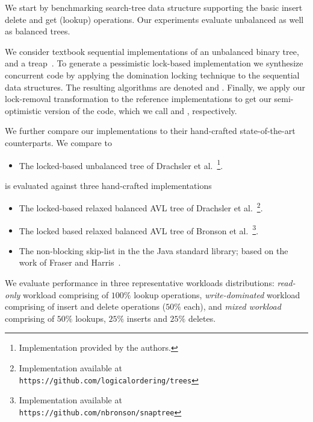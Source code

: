 We start by benchmarking search-tree data structure supporting the basic insert
delete and get (lookup) operations. Our experiments evaluate unbalanced as well
as balanced trees.  

We consider textbook sequential implementations of an unbalanced binary
tree, and a treap~\cite{AragonS1989}. To
generate a pessimistic lock-based implementation we synthesize
concurrent code by applying the domination locking technique to the sequential
data structures. The resulting algorithms are denoted \domTree and \domTreap.
Finally, we apply our lock-removal transformation to the reference
implementations to get our semi-optimistic version of the code, which we call
\autoTree and \autoTreap, respectively.     

We further compare our implementations to their hand-crafted state-of-the-art counterparts. We compare \autoTree to
\begin{itemize}
\item \danaTree The locked-based 
				unbalanced tree of Drachsler et
				al.~\cite{DrachslerVY2014}\footnote{Implementation provided by the authors.}.
\end{itemize}
\autoTreap is evaluated against three hand-crafted implementations
\begin{itemize}
\setlength{\itemsep}{0pt}
\setlength{\parskip}{0pt}
\item \danaAVL The locked-based relaxed balanced AVL tree of 
				Drachsler et al.~\cite{DrachslerVY2014}\footnote{Implementation available at \\
				\texttt{https://github.com/logicalordering/trees}}.
\item \bronson The locked based relaxed balanced AVL tree
				of Bronson et al.~\cite{BronsonCCO2010}\footnote{Implementation available at \\
				\texttt{https://github.com/nbronson/snaptree}}.
\item \skiplist The non-blocking skip-list in the 
				the Java standard library; based on the work of
				Fraser and Harris~\cite{fraser2004practical}.
\end{itemize}


We evaluate performance in three representative workloads distributions:
\emph{read-only} workload comprising of $100\%$ lookup operations, \emph{write-dominated}
workload comprising of insert and delete operations ($50\%$ each), and
\emph{mixed workload} comprising of $50\%$ lookups, $25\%$ inserts and $25\%$
deletes.

